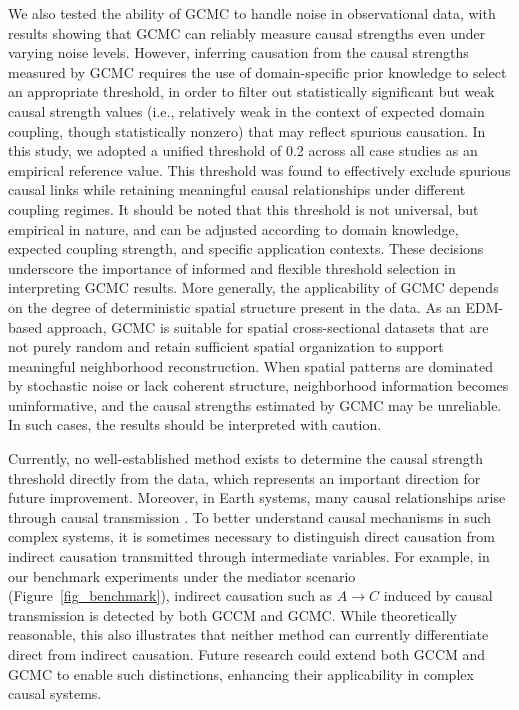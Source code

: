 \documentclass[authoryear,preprint,review,12pt]{elsarticle}
\begin{document}
We also tested the ability of GCMC to handle noise in observational data, with results showing that GCMC can reliably measure causal strengths even under varying noise levels. However, inferring causation from the causal strengths measured by GCMC requires the use of domain-specific prior knowledge to select an appropriate threshold, in order to filter out statistically significant but weak causal strength values (i.e., relatively weak in the context of expected domain coupling, though statistically nonzero) that may reflect spurious causation. In this study, we adopted a unified threshold of 0.2 across all case studies as an empirical reference value. This threshold was found to effectively exclude spurious causal links while retaining meaningful causal relationships under different coupling regimes. It should be noted that this threshold is not universal, but empirical in nature, and can be adjusted according to domain knowledge, expected coupling strength, and specific application contexts. These decisions underscore the importance of informed and flexible threshold selection in interpreting GCMC results. More generally, the applicability of GCMC depends on the degree of deterministic spatial structure present in the data. As an EDM-based approach, GCMC is suitable for spatial cross-sectional datasets that are not purely random and retain sufficient spatial organization to support meaningful neighborhood reconstruction. When spatial patterns are dominated by stochastic noise or lack coherent structure, neighborhood information becomes uninformative, and the causal strengths estimated by GCMC may be unreliable. In such cases, the results should be interpreted with caution.

Currently, no well-established method exists to determine the causal strength threshold directly from the data, which represents an important direction for future improvement. Moreover, in Earth systems, many causal relationships arise through causal transmission \citep{runge2019esstsc,runge2023tsc}. To better understand causal mechanisms in such complex systems, it is sometimes necessary to distinguish direct causation from indirect causation transmitted through intermediate variables. For example, in our benchmark experiments under the mediator scenario (Figure~\ref{fig_benchmark}), indirect causation such as \(A \to C\) induced by causal transmission is detected by both GCCM and GCMC. While theoretically reasonable, this also illustrates that neither method can currently differentiate direct from indirect causation. Future research could extend both GCCM and GCMC to enable such distinctions, enhancing their applicability in complex causal systems.
\end{document}
